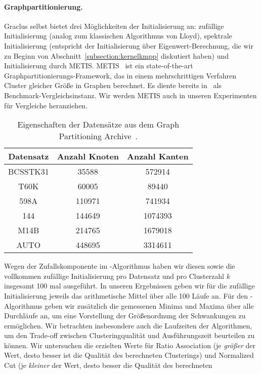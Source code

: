 \paragraph{Graphpartitionierung.} Graclus selbst bietet drei Möglichkeiten der Initialisierung an: zufällige Initialisierung (analog zum klassischen Algorithmus
von Lloyd), spektrale Initialisierung (entspricht der Initialisierung über Eigenwert-Berechnung, die wir zu Beginn von
Abschnitt~\ref{subsection:kernelkmpp} diskutiert haben) und Initialisierung durch METIS. METIS~\cite{KarypisK98} ist ein
state-of-the-art Graphpartitionierungs-Framework, das in einem mehrschrittigen Verfahren Cluster gleicher Größe in Graphen
berechnet. Es diente bereits in~\cite{DhillonGK04,DhillonGK07} als Benchmark-Vergleichsinstanz. Wir werden METIS auch in
unseren Experimenten für Vergleiche heranziehen.
\begin{table}[t]
\centering
\begin{tabular}{@{}ccc@{}} \toprule
	\textbf{Datensatz} & \textbf{Anzahl Knoten} & \textbf{Anzahl Kanten} \\ \midrule
	BCSSTK31 & 35588 & 572914 \\
	T60K & 60005 & 89440 \\
	598A & 110971 & 741934 \\
	144 & 144649 & 1074393 \\
	M14B & 214765 & 1679018 \\
	AUTO & 448695 & 3314611 \\
	\bottomrule
\end{tabular}
\caption{Eigenschaften der Datensätze aus dem Graph Partitioning Archive~\cite{SoperWC04}.}
\label{tbl:experiment-kkmpp-datasets}
\end{table}
\absatz
Wegen der Zufallskomponente im \kkmpp-Algorithmus haben wir diesen sowie die vollkommen zufällige Initialisierung pro
Datensatz und pro Clusterzahl $k$ insgesamt 100 mal ausgeführt. In unseren Ergebnissen geben wir für die zufällige Initialisierung
jeweils das arithmetische Mittel über alle 100 Läufe an. Für den \kkmpp-Algorithmus geben wir zusätzlich die gemessenen Minima
und Maxima über alle Durchläufe an, um eine Vorstellung der Größenordnung der Schwankungen zu ermöglichen. Wir betrachten
insbesondere auch die Laufzeiten der Algorithmen, um den Trade-off zwischen Clusteringqualität und Ausführungszeit beurteilen
zu können. Wir untersuchen die erzielten Werte für Ratio Association (je \emph{größer} der Wert, desto besser ist die Qualität
des berechneten Clusterings) und Normalized Cut (je \emph{kleiner} der Wert, desto besser die Qualität des berechneten
